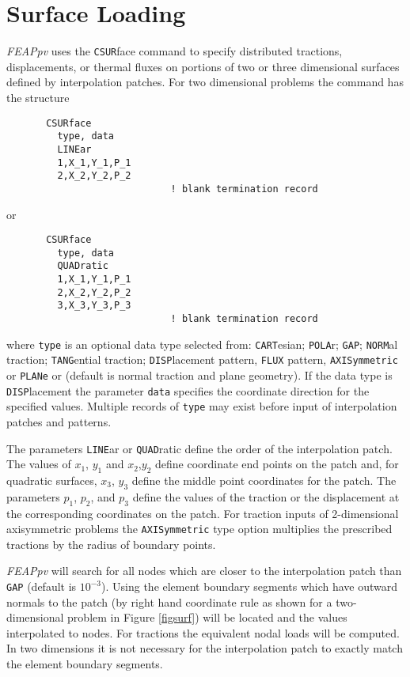 \section{Surface Loading}
\label{surf}

{\sl FEAPpv} uses the {\tt CSUR}face command to specify distributed tractions,
displacements, or thermal fluxes on portions of two or three dimensional
surfaces defined by interpolation patches.
For two dimensional problems the command has the structure
\begin{verbatim}
       CSURface
         type, data
         LINEar
         1,X_1,Y_1,P_1
         2,X_2,Y_2,P_2
                             ! blank termination record
\end{verbatim}
or
\begin{verbatim}
       CSURface
         type, data
         QUADratic
         1,X_1,Y_1,P_1
         2,X_2,Y_2,P_2
         3,X_3,Y_3,P_3
                             ! blank termination record
\end{verbatim}
where
\texttt{type} is an optional data type selected from:
\texttt{CART}esian; {\tt POLA}r; {\tt GAP};
\texttt{NORM}al traction;
\texttt{TANG}ential traction;
\texttt{DISP}lacement pattern,
\texttt{FLUX} pattern,
\texttt{AXISymmetric} or
\texttt{PLANe} or
 (default is normal traction and plane geometry).
If the data type is {\tt DISP}lacement the parameter {\tt data} specifies
the coordinate direction for the specified values.
Multiple records of {\tt type} may exist before input of interpolation
patches and patterns.

The parameters {\tt LINE}ar or {\tt QUAD}ratic define the order of the
interpolation patch.  The values of $x_1$, $y_1$ and $x_2$,$y_2$ define
coordinate end points on the patch and,
for quadratic surfaces, $x_3$, $y_3$ define
the middle point coordinates for the patch.
The parameters $p_1$, $p_2$, and $p_3$ define the values of the traction
or the displacement at the corresponding coordinates on the patch.
For traction inputs of 2-dimensional axisymmetric problems
the \texttt{AXISymmetric} type option multiplies the prescribed tractions by
the radius of boundary points. 

{\sl FEAPpv} will search for all nodes which are closer to the interpolation
patch than {\tt GAP} (default is $10^{-3}$).  Using the element boundary
segments which have outward normals to the patch (by right hand coordinate
rule as shown for a two-dimensional problem in Figure \ref{figsurf})
will be located and the values interpolated to nodes.  For tractions
the equivalent nodal loads will be computed.  In two dimensions it is
not necessary for the interpolation patch to exactly match the element
boundary segments.

